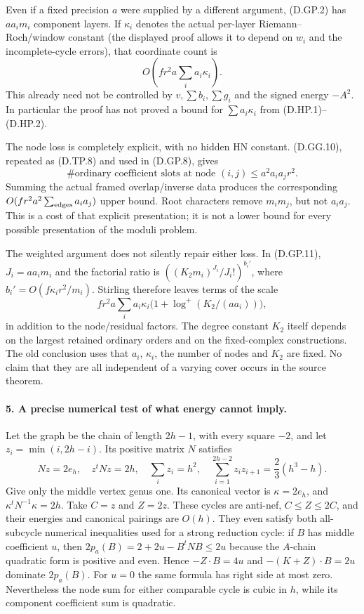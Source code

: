 Even if a fixed precision $a$ were supplied by a different
argument, (D.GP.2) has $aa_i m_i$ component layers. If $\kappa_i$
denotes the actual per-layer Riemann--Roch/window constant
(the displayed proof allows it to depend on $w_i$ and the
incomplete-cycle errors), that coordinate count is
\[
 O\!\left(fr^2 a\sum_i a_i\kappa_i\right).              \tag{D.HP.10}
\]
This already need not be controlled by $v,\sum b_i,\sum g_i$
and the signed energy $-A^2$. In particular the proof has not
proved a bound for $\sum a_i\kappa_i$ from (D.HP.1)--(D.HP.2).

The node loss is completely explicit, with no hidden HN constant.
(D.GG.10), repeated as (D.TP.8) and used in (D.GP.8), gives
\[
 \#\text{ordinary coefficient slots at node }(i,j)
       \le a^2 a_i a_j r^2.                             \tag{D.HP.11}
\]
Summing the actual framed overlap/inverse data produces the
corresponding $O(fr^2a^2\sum_{\rm edges}a_i a_j)$ upper bound.
Root characters remove $m_i m_j$, but not $a_i a_j$.
This is a cost of that explicit presentation; it is not a
lower bound for every possible presentation of the moduli problem.

The weighted argument does not silently repair either loss.
In (D.GP.11), $J_i=aa_i m_i$ and the factorial ratio is
$((K_2m_i)^{J_i}/J_i!)^{b_i'}$, where
$b_i'=O(f\kappa_i r^2/m_i)$. Stirling therefore leaves terms
of the scale
\[
 fr^2a\sum_i a_i\kappa_i
       \bigl(1+\log^+(K_2/(aa_i))\bigr),                \tag{D.HP.12}
\]
in addition to the node/residual factors. The degree constant
$K_2$ itself depends on the largest retained ordinary orders and
on the fixed-complex constructions. The old conclusion uses
that $a_i$, $\kappa_i$, the number of nodes and $K_2$ are fixed.
No claim that they are all independent of a varying cover occurs
in the source theorem.

\paragraph{5. A precise numerical test of what energy cannot imply.}
Let the graph be the chain of length $2h-1$, with every square
$-2$, and let $z_i=\min(i,2h-i)$. Its positive matrix $N$ satisfies
\[
 Nz=2e_h,\quad z^tNz=2h,\quad
 \sum_i z_i=h^2,\quad
 \sum_{i=1}^{2h-2}z_i z_{i+1}=\frac23(h^3-h).           \tag{D.HP.13}
\]
Give only the middle vertex genus one. Its canonical vector is
$\kappa=2e_h$, and $\kappa^tN^{-1}\kappa=2h$.
Take $C=z$ and $Z=2z$. These cycles are anti-nef,
$C\le Z\le2C$, and their energies and canonical pairings are
$O(h)$. They even satisfy both all-subcycle numerical inequalities
used for a strong reduction cycle: if $B$ has middle coefficient
$u$, then
$2p_a(B)=2+2u-B^tNB\le2u$ because the $A$-chain quadratic
form is positive and even. Hence
$-Z\cdot B=4u$ and $-(K+Z)\cdot B=2u$ dominate $2p_a(B)$.
For $u=0$ the same formula has right side at most zero.
Nevertheless the node sum for either comparable cycle is cubic
in $h$, while its component coefficient sum is quadratic.

